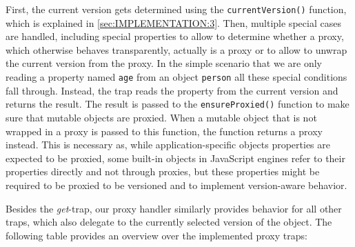 First, the current version gets determined using the \lstinline{currentVersion()} function, which is explained in \ref{sec:IMPLEMENTATION:3}.
Then, multiple special cases are handled, including special properties to allow to determine whether a proxy, which otherwise behaves transparently, actually is a proxy or to allow to unwrap the current version from the proxy.
In the simple scenario that we are only reading a property named \lstinline{age} from an object \lstinline{person} all these special conditions fall through.
Instead, the trap reads the property from the current version and returns the result.
The result is passed to the \lstinline{ensureProxied()} function to make sure that mutable objects are proxied.
When a mutable object that is not wrapped in a proxy is passed to this function, the function returns a proxy instead.
This is necessary as, while application-specific objects properties are expected to be proxied, some built-in objects in JavaScript engines refer to their properties directly and not through proxies, but these properties might be required to be proxied to be versioned and to implement version-aware behavior.


Besides the \emph{get}-trap, our proxy handler similarly provides behavior for all other traps, which also delegate to the currently selected version of the object.
The following table  provides an overview over the implemented proxy traps:

